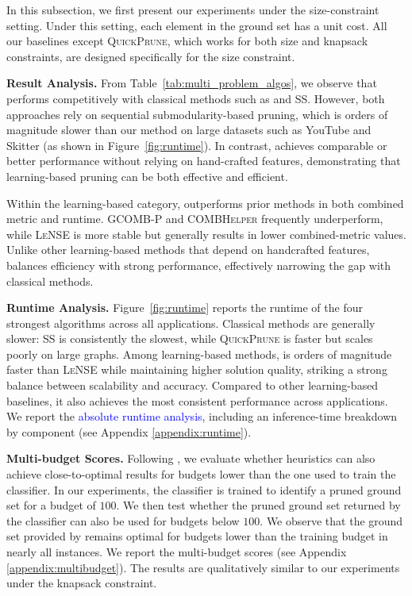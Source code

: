 In this subsection, we first present our experiments under the size-constraint setting. Under this setting, each element in the ground set has a unit cost. All our baselines except \textsc{QuickPrune}, which works for both size and knapsack constraints, are designed specifically for the size constraint.

\textbf{Result Analysis.} From Table~\ref{tab:multi_problem_algos}, we observe that \llm performs competitively with classical methods such as \qp and SS. However, both approaches rely on sequential submodularity-based pruning, which is orders of magnitude slower than our method on large datasets such as YouTube and Skitter (as shown in Figure~\ref{fig:runtime}). In contrast, \llm achieves comparable or better performance without relying on hand-crafted features, demonstrating that learning-based pruning can be both effective and efficient.



Within the learning-based category, \llm outperforms prior methods in both combined metric and runtime. GCOMB-P and \textsc{COMBHelper} frequently underperform, while \textsc{LeNSE} is more stable but generally results in lower combined-metric values. Unlike other learning-based methods that depend on handcrafted features, \llm balances efficiency with strong performance, effectively narrowing the gap with classical methods.

\textbf{Runtime Analysis.} Figure~\ref{fig:runtime} reports the runtime of the four strongest algorithms across all applications. Classical methods are generally slower: SS is consistently the slowest, while \textsc{QuickPrune} is faster but scales poorly on large graphs. Among learning-based methods, \llm is orders of magnitude faster than \textsc{LeNSE} while maintaining higher solution quality, striking a strong balance between scalability and accuracy. Compared to other learning-based baselines, it also achieves the most consistent performance across applications. We report the \textcolor{blue}{absolute runtime analysis}, including an inference-time breakdown by component (see Appendix \ref{appendix:runtime}).

\textbf{Multi-budget Scores.} Following \cite{ireland2022lense}, we evaluate whether heuristics can also achieve close-to-optimal results for budgets lower than the one used to train the classifier. In our experiments, the classifier is trained to identify a pruned ground set for a budget of $100$. We then test whether the pruned ground set returned by the classifier can also be used for budgets below $100$. We observe that the ground set provided by \llm remains optimal for budgets lower than the training budget in nearly all instances. We report the multi-budget scores (see Appendix \ref{appendix:multibudget}). The results are qualitatively similar to our experiments under the knapsack constraint.

